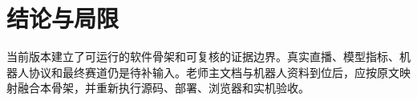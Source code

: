 \section{结论与局限}

当前版本建立了可运行的软件骨架和可复核的证据边界。真实直播、模型指标、机器人协议和最终赛道仍是待补输入。老师主文档与机器人资料到位后，应按原文映射融合本骨架，并重新执行源码、部署、浏览器和实机验收。
